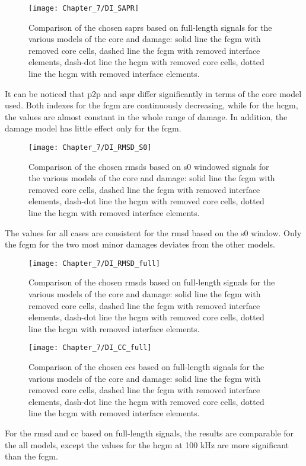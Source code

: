 \begin{figure}[!tbh]
	\begin{center}
		\texttt{[image: Chapter\_7/DI\_SAPR]}
	\end{center}
	\caption{Comparison of the chosen \acfp{sapr} based on full-length signals for the various models of the core and damage: solid line the \acf{fcgm} with removed core cells, dashed line the \acf{fcgm} with removed interface elements, dash-dot line the \acf{hcgm} with removed core cells, dotted line the \acf{hcgm} with removed interface elements.}
	\label{fig:DI_SAPR}
\end{figure}
It can be noticed that \ac{p2p} and \ac{sapr} differ significantly in terms of the core model used. Both indexes for the \ac{fcgm} are continuously decreasing, while for the \ac{hcgm}, the values are almost constant in the whole range of damage.
In addition, the damage model has little effect only for the \ac{fcgm}.

\begin{figure}[!tbh]
	\begin{center}
		\texttt{[image: Chapter\_7/DI\_RMSD\_S0]}
	\end{center}
	\caption{Comparison of the chosen \acfp{rmsd} based on \ac{s0} windowed signals for the various models of the core and damage: solid line the \acf{fcgm} with removed core cells, dashed line the \acf{fcgm} with removed interface elements, dash-dot line the \acf{hcgm} with removed core cells, dotted line the \acf{hcgm} with removed interface elements.}
	\label{fig:DI_RMSD_S0}
\end{figure}

The values for all cases are consistent for the \ac{rmsd} based on the \ac{s0} window.
Only the \ac{fcgm} for the two most minor damages deviates from the other models.
\begin{figure}[!tbh]
	\begin{center}
		\texttt{[image: Chapter\_7/DI\_RMSD\_full]}
	\end{center}
	\caption{Comparison of the chosen \acfp{rmsd} based on full-length signals for the various models of the core and damage: solid line the \acf{fcgm} with removed core cells, dashed line the \acf{fcgm} with removed interface elements, dash-dot line the \acf{hcgm} with removed core cells, dotted line the \acf{hcgm} with removed interface elements.}
	\label{fig:DI_RMSD_full}
\end{figure}

\begin{figure}[!tbh]
	\begin{center}
		\texttt{[image: Chapter\_7/DI\_CC\_full]}
	\end{center}
	\caption{Comparison of the chosen \acfp{cc} based on full-length signals for the various models of the core and damage: solid line the \acf{fcgm} with removed core cells, dashed line the \acf{fcgm} with removed interface elements, dash-dot line the \acf{hcgm} with removed core cells, dotted line the \acf{hcgm} with removed interface elements.}
	\label{fig:DI_CC}
\end{figure}

For the \ac{rmsd} and \ac{cc} based on full-length signals, the results are comparable for the all models, except the values for the \ac{hcgm} at 100 \unit{kHz} are more significant than the \ac{fcgm}.
